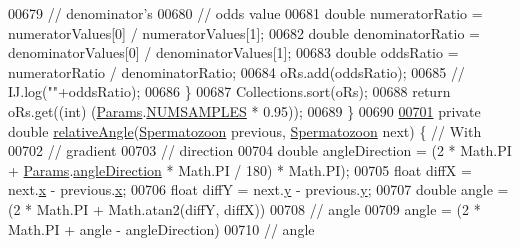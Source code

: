 \begin{DoxyCode}
{00679                                                                 \textcolor{comment}{// denominator's}
00680                                                                 \textcolor{comment}{// odds value}
00681       \textcolor{keywordtype}{double} numeratorRatio = numeratorValues[0] / numeratorValues[1];
00682       \textcolor{keywordtype}{double} denominatorRatio = denominatorValues[0] / denominatorValues[1];
00683       \textcolor{keywordtype}{double} oddsRatio = numeratorRatio / denominatorRatio;
00684       oRs.add(oddsRatio);
00685       \textcolor{comment}{// IJ.log(""+oddsRatio);}
00686     \}
00687     Collections.sort(oRs);
00688     \textcolor{keywordflow}{return} oRs.get((\textcolor{keywordtype}{int}) (\hyperlink{classdata_1_1_params}{Params}.\hyperlink{classdata_1_1_params_ae808f1c980157cfd070c6e09e587e2aa}{NUMSAMPLES} * 0.95));
00689   \}
00690 
\hypertarget{_chemotaxis_8java_source_l00701}{}\hyperlink{classanalysis_1_1_chemotaxis_ab23f946e0f1055d348e975e3058f323d}{00701}   \textcolor{keyword}{private} \textcolor{keywordtype}{double} \hyperlink{classanalysis_1_1_chemotaxis_ab23f946e0f1055d348e975e3058f323d}{relativeAngle}(\hyperlink{classdata_1_1_spermatozoon}{Spermatozoon} previous, 
      \hyperlink{classdata_1_1_spermatozoon}{Spermatozoon} next) \{ \textcolor{comment}{// With}
00702                                                                            \textcolor{comment}{// gradient}
00703                                                                            \textcolor{comment}{// direction}
00704     \textcolor{keywordtype}{double} angleDirection = (2 * Math.PI + \hyperlink{classdata_1_1_params}{Params}.\hyperlink{classdata_1_1_params_a11ad187f45e1f7add56bde4071bfdf74}{angleDirection} * Math.PI / 180) %
      * Math.PI);
00705     \textcolor{keywordtype}{float} diffX = next.\hyperlink{classdata_1_1_spermatozoon_ad0da36b2558901e21e7a30f6c227a45e}{x} - previous.\hyperlink{classdata_1_1_spermatozoon_ad0da36b2558901e21e7a30f6c227a45e}{x};
00706     \textcolor{keywordtype}{float} diffY = next.\hyperlink{classdata_1_1_spermatozoon_aa4f0d3eebc3c443f9be81bf48561a217}{y} - previous.\hyperlink{classdata_1_1_spermatozoon_aa4f0d3eebc3c443f9be81bf48561a217}{y};
00707     \textcolor{keywordtype}{double} angle = (2 * Math.PI + Math.atan2(diffY, diffX)) %
00708                                                                              \textcolor{comment}{// angle}
00709     angle = (2 * Math.PI + angle - angleDirection) %
00710                                                                     \textcolor{comment}{// angle}
}
\end{DoxyCode}
